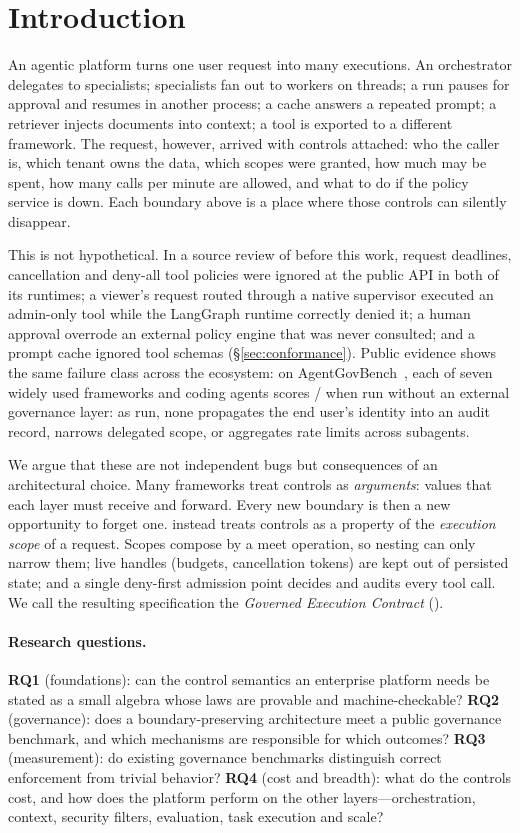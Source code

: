 \section{Introduction}
\label{sec:introduction}
An agentic platform turns one user request into many executions. An orchestrator delegates to specialists; specialists fan out to workers on threads; a run pauses for approval and resumes in another process; a cache answers a repeated prompt; a retriever injects documents into context; a tool is exported to a different framework. The request, however, arrived with controls attached: who the caller is, which tenant owns the data, which scopes were granted, how much may be spent, how many calls per minute are allowed, and what to do if the policy service is down. Each boundary above is a place where those controls can silently disappear.

This is not hypothetical. In a source review of \method{} before this work, request deadlines, cancellation and deny-all tool policies were ignored at the public API in both of its runtimes; a viewer's request routed through a native supervisor executed an admin-only tool while the LangGraph runtime correctly denied it; a human approval overrode an external policy engine that was never consulted; and a prompt cache ignored tool schemas (\S\ref{sec:conformance}). Public evidence shows the same failure class across the ecosystem: on AgentGovBench~\cite{agentgovbench}, each of seven widely used frameworks and coding agents scores \AGBNativeScore{}/\AGBTotal{} when run without an external governance layer: as run, none propagates the end user's identity into an audit record, narrows delegated scope, or aggregates rate limits across subagents.

We argue that these are not independent bugs but consequences of an architectural choice. Many frameworks treat controls as \emph{arguments}: values that each layer must receive and forward. Every new boundary is then a new opportunity to forget one. \method{} instead treats controls as a property of the \emph{execution scope} of a request. Scopes compose by a meet operation, so nesting can only narrow them; live handles (budgets, cancellation tokens) are kept out of persisted state; and a single deny-first admission point decides and audits every tool call. We call the resulting specification the \emph{Governed Execution Contract} (\gec{}).

\paragraph{Research questions.}
\textbf{RQ1} (foundations): can the control semantics an enterprise platform needs be stated as a small algebra whose laws are provable and machine-checkable? \textbf{RQ2} (governance): does a boundary-preserving architecture meet a public governance benchmark, and which mechanisms are responsible for which outcomes? \textbf{RQ3} (measurement): do existing governance benchmarks distinguish correct enforcement from trivial behavior? \textbf{RQ4} (cost and breadth): what do the controls cost, and how does the platform perform on the other layers---orchestration, context, security filters, evaluation, task execution and scale?

